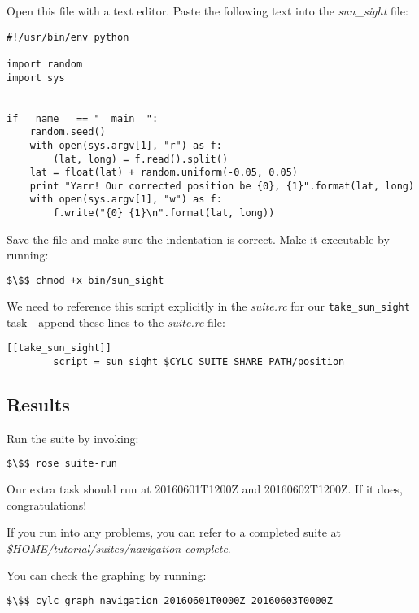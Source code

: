 Open this file with a text editor. Paste the following text into the {\em sun\_sight} file:

\lstset{language=Python}
\begin{lstlisting}[columns=fullflexible]
#!/usr/bin/env python

import random
import sys


if __name__ == "__main__":
    random.seed()
    with open(sys.argv[1], "r") as f:
        (lat, long) = f.read().split()
    lat = float(lat) + random.uniform(-0.05, 0.05)
    print "Yarr! Our corrected position be {0}, {1}".format(lat, long)
    with open(sys.argv[1], "w") as f:
        f.write("{0} {1}\n".format(lat, long))
\end{lstlisting}

Save the file and make sure the indentation is correct. Make it executable by running:

\begin{lstlisting}[mathescape, language=bash]
$\$$ chmod +x bin/sun_sight
\end{lstlisting}

We need to reference this script explicitly in the {\em suite.rc} for our \lstinline{take_sun_sight} task - append these lines to the {\em suite.rc} file:

\lstset{language=suiterc}
\begin{lstlisting}[columns=fullflexible]
    [[take_sun_sight]]
        script = sun_sight $CYLC_SUITE_SHARE_PATH/position
\end{lstlisting}

\subsection{Results}

Run the suite by invoking:
\begin{lstlisting}[mathescape, language=bash]
$\$$ rose suite-run
\end{lstlisting}

Our extra task should run at 20160601T1200Z and 20160602T1200Z. If it does, congratulations!

If you run into any problems, you can refer to a completed suite at {\em \$HOME/tutorial/suites/navigation-complete}.

You can check the graphing by running:

\begin{lstlisting}[mathescape, language=bash]
$\$$ cylc graph navigation 20160601T0000Z 20160603T0000Z
\end{lstlisting}

